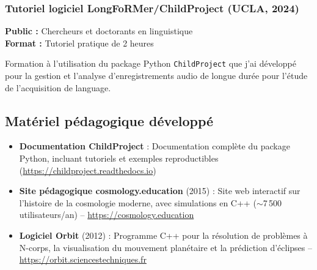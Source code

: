 \documentclass[11pt,a4paper]{article}
\begin{document}
\subsubsection{Tutoriel logiciel LongFoRMer/ChildProject (UCLA, 2024)}

\noindent\textbf{Public :} Chercheurs et doctorants en linguistique\\
\textbf{Format :} Tutoriel pratique de 2 heures

Formation à l'utilisation du package Python \texttt{ChildProject} que j'ai développé pour la gestion et l'analyse d'enregistrements audio de longue durée pour l'étude de l'acquisition de language.

\subsection{Matériel pédagogique développé}

\begin{itemize}
    \item \textbf{Documentation ChildProject} : Documentation complète du package Python, incluant tutoriels et exemples reproductibles (\url{https://childproject.readthedocs.io})
    \item \textbf{Site pédagogique cosmology.education} (2015) : Site web interactif sur l'histoire de la cosmologie moderne, avec simulations en C++ ($\sim$7\,500 utilisateurs/an) -- \url{https://cosmology.education}
    \item \textbf{Logiciel Orbit} (2012) : Programme C++ pour la résolution de problèmes à N-corps, la visualisation du mouvement planétaire et la prédiction d'éclipses -- \url{https://orbit.sciencestechniques.fr}
\end{itemize}



\end{document}
